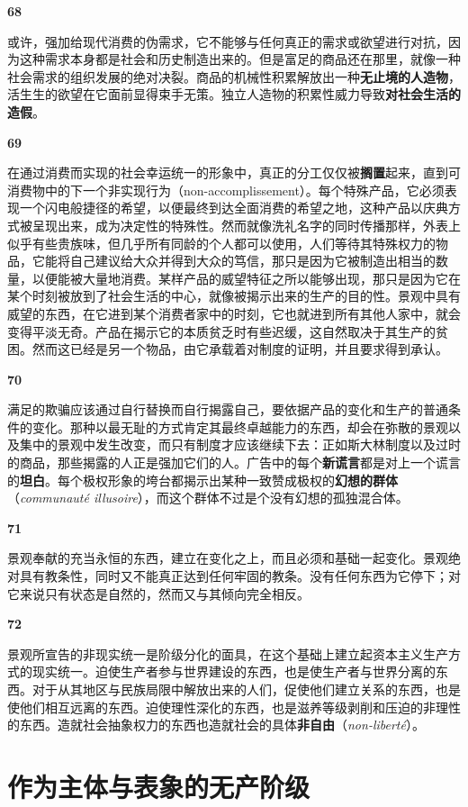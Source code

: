 \documentclass[fontset=fandol, a4paper, 12pt, openright]{ctexbook}
\makeatletter
\newcommand{\thesis}[1]{%
    \par\vspace{1.5em}%
    {\centering \textbf{\Large #1}\par}%
    \nobreak\vspace{0.5em}\nobreak
    \@afterindenttrue %
    \@afterheading    %
}
\makeatother
\begin{document}
\thesis{68}
或许，强加给现代消费的伪需求，它不能够与任何真正的需求或欲望进行对抗，因为这种需求本身都是社会和历史制造出来的。但是富足的商品还在那里，就像一种社会需求的组织发展的绝对决裂。商品的机械性积累解放出一种\textbf{无止境的人造物}，活生生的欲望在它面前显得束手无策。独立人造物的积累性威力导致\textbf{对社会生活的造假}。

\thesis{69}
在通过消费而实现的社会幸运统一的形象中，真正的分工仅仅被\textbf{搁置}起来，直到可消费物中的下一个非实现行为（non-accomplissement）。每个特殊产品，它必须表现一个闪电般捷径的希望，以便最终到达全面消费的希望之地，这种产品以庆典方式被呈现出来，成为决定性的特殊性。然而就像洗礼名字的同时传播那样，外表上似乎有些贵族味，但几乎所有同龄的个人都可以使用，人们等待其特殊权力的物品，它能将自己建议给大众并得到大众的笃信，那只是因为它被制造出相当的数量，以便能被大量地消费。某样产品的威望特征之所以能够出现，那只是因为它在某个时刻被放到了社会生活的中心，就像被揭示出来的生产的目的性。景观中具有威望的东西，在它进到某个消费者家中的时刻，它也就进到所有其他人家中，就会变得平淡无奇。产品在揭示它的本质贫乏时有些迟缓，这自然取决于其生产的贫困。然而这已经是另一个物品，由它承载着对制度的证明，并且要求得到承认。

\thesis{70}
满足的欺骗应该通过自行替换而自行揭露自己，要依据产品的变化和生产的普通条件的变化。那种以最无耻的方式肯定其最终卓越能力的东西，却会在弥散的景观以及集中的景观中发生改变，而只有制度才应该继续下去：正如斯大林制度以及过时的商品，那些揭露的人正是强加它们的人。广告中的每个\textbf{新谎言}都是对上一个谎言的\textbf{坦白}。每个极权形象的垮台都揭示出某种一致赞成极权的\textbf{幻想的群体}（\textit{communauté illusoire}），而这个群体不过是个没有幻想的孤独混合体。

\thesis{71}
景观奉献的充当永恒的东西，建立在变化之上，而且必须和基础一起变化。景观绝对具有教条性，同时又不能真正达到任何牢固的教条。没有任何东西为它停下；对它来说只有状态是自然的，然而又与其倾向完全相反。

\thesis{72}
景观所宣告的非现实统一是阶级分化的面具，在这个基础上建立起资本主义生产方式的现实统一。迫使生产者参与世界建设的东西，也是使生产者与世界分离的东西。对于从其地区与民族局限中解放出来的人们，促使他们建立关系的东西，也是使他们相互远离的东西。迫使理性深化的东西，也是滋养等级剥削和压迫的非理性的东西。造就社会抽象权力的东西也造就社会的具体\textbf{非自由}（\textit{non-liberté}）。

\chapter{作为主体与表象的无产阶级}
\end{document}
